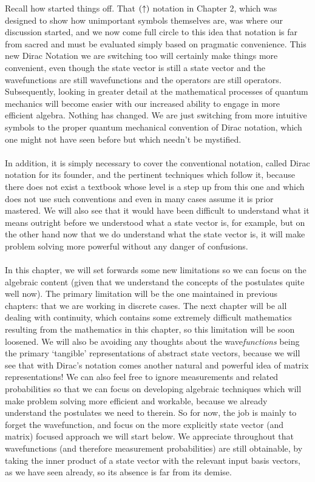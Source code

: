 Recall how started things off. That $(\uparrow)$ notation in Chapter 2, which was designed to show how unimportant symbols themselves are, was where our discussion started, and we now come full circle to this idea that notation is far from sacred and must be evaluated simply based on pragmatic convenience. This new Dirac Notation we are switching too will certainly make things more convenient, even though the state vector is still a state vector and the wavefunctions are still wavefunctions and the operators are still operators. Subsequently, looking in greater detail at the mathematical processes of quantum mechanics will become easier with our increased ability to engage in more efficient algebra. Nothing has changed. We are just switching from more intuitive symbols to the proper quantum mechanical convention of Dirac notation, which one might not have seen before but which needn't be mystified.
\\\\
In addition, it is simply necessary to cover the conventional notation, called Dirac notation for its founder, and the pertinent techniques which follow it, because there does not exist a textbook whose level is a step up from this one and which does not use such conventions and even in many cases assume it is prior mastered. We will also see that it would have been difficult to understand what it means outright before we understood what a state vector is, for example, but on the other hand now that we do understand what the state vector is, it will make problem solving more powerful without any danger of confusions. 
\\\\
In this chapter, we will set forwards some new limitations so we can focus on the algebraic content (given that we understand the concepts of the postulates quite well now). The primary limitation will be the one maintained in previous chapters: that we are working in discrete cases. The next chapter will be all dealing with continuity, which contains some extremely difficult mathematics resulting from the mathematics in this chapter, so this limitation will be soon loosened. We will also be avoiding any thoughts about the wave\textit{functions} being the primary `tangible' representations of abstract state vectors, because we will see that with Dirac's notation comes another natural and powerful idea of matrix representations! We can also feel free to ignore measurements and related probabilities so that we can focus on developing algebraic techniques which will make problem solving more efficient and workable, because we already understand the postulates we need to therein. So for now, the job is mainly to forget the wavefunction, and focus on the more explicitly state vector (and matrix) focused approach we will start below. We appreciate throughout that wavefunctions (and therefore measurement probabilities) are still obtainable, by taking the inner product of a state vector with the relevant input basis vectors, as we have seen already, so its absence is far from its demise.

